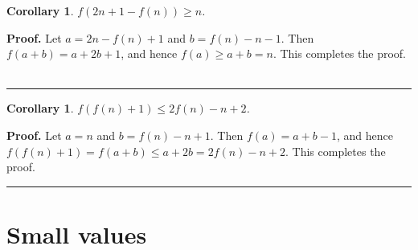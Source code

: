 \documentclass[12]{article}
\newtheorem{corollary}[theorem]{Corollary}
\newenvironment{proof}[1][Proof]{\textbf{#1.} }{\ \rule{0.5em}{0.5em}}
\begin{document}
\begin{corollary} \label{pro}
$f(2n + 1 - f(n)) \ge n$.
\end{corollary}
\begin{proof}
Let $a = 2n - f(n) + 1$ and $b = f(n) - n - 1$. Then $f(a+b) = a + 2b + 1$, and hence $f(a) \ge a+b = n$. This completes the proof.
\end{proof}

\begin{corollary} \label{pro2}
$f(f(n)+1) \le 2f(n)-n+2$.
\end{corollary}
\begin{proof}
Let $a =n$ and $b = f(n)-n+1$. Then $f(a) = a + b - 1$, and hence $f(f(n)+1)=f(a+b) \le a+2b = 2f(n)-n+2$. This completes the proof.
\end{proof}

\section{Small values} \label{sv}
\end{document}

